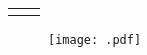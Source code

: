 
\begin{table}[H]
    \centering
    \caption{}
    \label{tab:}
    \begin{tabular}{c c}
        \toprule
        {} & {} \\
        \midrule
         & \\
        \bottomrule
    \end{tabular}
\end{table}



\begin{figure}[H]
    \centering
    \texttt{[image: .pdf]}
    \caption{}
    \label{fig:}
\end{figure}